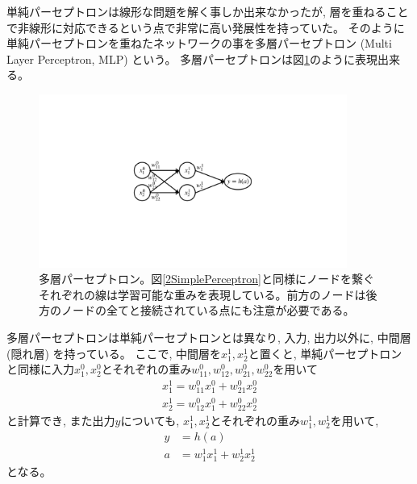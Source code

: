 単純パーセプトロンは線形な問題を解く事しか出来なかったが, 層を重ねることで非線形に対応できるという点で非常に高い発展性を持っていた\cite{ApproximationSuperpositionsSigmoidalFunction}。
そのように単純パーセプトロンを重ねたネットワークの事を多層パーセプトロン (Multi Layer Perceptron, MLP) という。
多層パーセプトロンは図\ref{4MultiLayerPerceptron}のように表現出来る。

\begin{figure}[htbp]
 \centering
 \includegraphics[trim = 250 350 250 350, width=0.9\textwidth, clip]{Figure/2DeepLearning/4MultiLayerPerceptron.png}
 \caption[多層パーセプトロン]{多層パーセプトロン。図\ref{2SimplePerceptron}と同様にノードを繋ぐそれぞれの線は学習可能な重みを表現している。前方のノードは後方のノードの全てと接続されている点にも注意が必要である。}
 \label{4MultiLayerPerceptron}
\end{figure}

多層パーセプトロンは単純パーセプトロンとは異なり, 入力, 出力以外に, 中間層 (隠れ層) を持っている。
ここで, 中間層を$x^1_1,x^1_2$と置くと, 単純パーセプトロンと同様に入力$x^0_1,x^0_2$とそれぞれの重み$w^0_{11},w^0_{12},w^0_{21},w^0_{22}$を用いて
\begin{equation}
 \begin{split}
  x^1_1 = w^0_{11}x^0_1 + w^0_{21}x^0_2 \\
  x^1_2 = w^0_{12}x^0_1 + w^0_{22}x^0_2
 \end{split} 
\end{equation}
と計算でき, また出力$y$についても, $x^1_1,x^1_2$とそれぞれの重み$w^1_{1},w^1_{2}$を用いて, 
\begin{equation}
 \begin{split}
  y &= h(a)\\
  a &= w^1_{1}x^1_1 + w^1_{2}x^1_2
 \end{split}
\end{equation}
となる。

